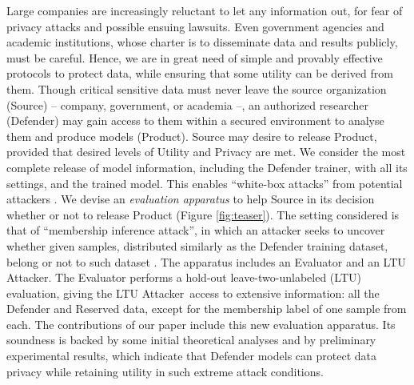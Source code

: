 \documentclass[letterpaper]{article}
\newcommand{\oracle}{LTU Attacker~}
\begin{document}
    Large companies are increasingly reluctant to let any information out, for fear of privacy attacks and possible ensuing lawsuits. Even government agencies and academic institutions, whose charter is to disseminate data and results publicly, must be careful. Hence, we are in great need of simple and provably effective protocols to protect data, while ensuring that some utility can be derived from them. Though critical sensitive data must never leave the source organization (Source) -- company, government, or academia --, an authorized researcher (Defender) may gain access to them within a secured environment to analyse them and produce models (Product). Source may desire to release Product, provided that desired levels of Utility and Privacy are met.  We consider the most complete release of model information, including the Defender trainer, with all its settings, and the trained model. This enables ``white-box attacks'' from potential attackers \cite{nasr2019comprehensive}.
    We devise an {\em evaluation apparatus} to help Source in its decision whether or not to release Product (Figure \ref{fig:teaser}). The setting considered is that of ``membership inference attack'', in which an attacker seeks to uncover whether given samples, distributed similarly as the Defender training dataset, belong or not to such dataset \cite{shokri2017membership}.
    The apparatus includes an Evaluator and an LTU Attacker. The Evaluator performs a hold-out leave-two-unlabeled (LTU) evaluation, giving the \oracle access to extensive information: all the Defender and Reserved data, except for the membership label of one sample from each. The contributions of our paper include this new evaluation apparatus. Its soundness is backed by some initial theoretical analyses and by preliminary experimental results, which indicate that Defender models can protect data privacy while retaining utility in such extreme attack conditions.
\end{document}
